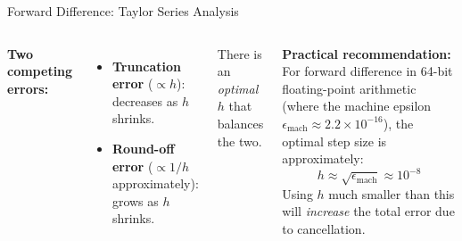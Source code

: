 \documentclass[aspectratio=169,10pt]{beamer}
\begin{document}
\begin{frame}[allowframebreaks]{Forward Difference: Taylor Series Analysis}
  \begin{columns}[T]
    \textbf{Two competing errors:}
    \begin{itemize}
      \item \textbf{Truncation error} ($\propto h$): decreases as $h$ shrinks.
      \item \textbf{Round-off error} ($\propto 1/h$ approximately): grows as
            $h$ shrinks.
    \end{itemize}
    There is an \emph{optimal} $h$ that balances the two.

    \textbf{Practical recommendation:}
    For forward difference in 64-bit floating-point arithmetic (where the
    machine epsilon $\epsilon_{\text{mach}} \approx 2.2 \times 10^{-16}$),
    the optimal step size is approximately:
    \[
      h \approx \sqrt{\epsilon_{\text{mach}}} \approx 10^{-8}
    \]
    Using $h$ much smaller than this will \emph{increase} the total error
    due to cancellation.
  \end{columns}

\end{frame}
\end{document}

